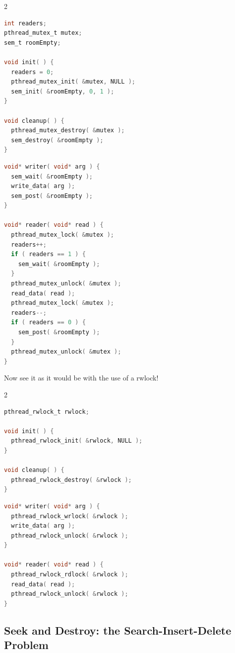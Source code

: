 \begin{multicols}{2}
	\begin{lstlisting}[language=C]
int readers;
pthread_mutex_t mutex;
sem_t roomEmpty;

void init( ) {
  readers = 0;
  pthread_mutex_init( &mutex, NULL );
  sem_init( &roomEmpty, 0, 1 );
}

void cleanup( ) {
  pthread_mutex_destroy( &mutex );
  sem_destroy( &roomEmpty );
}
\end{lstlisting}

	\columnbreak

	\begin{lstlisting}[language=C]
void* writer( void* arg ) {
  sem_wait( &roomEmpty );
  write_data( arg );
  sem_post( &roomEmpty );
}

void* reader( void* read ) {
  pthread_mutex_lock( &mutex );
  readers++;
  if ( readers == 1 ) {
    sem_wait( &roomEmpty );
  }
  pthread_mutex_unlock( &mutex );
  read_data( read );
  pthread_mutex_lock( &mutex );
  readers--;
  if ( readers == 0 ) {
    sem_post( &roomEmpty );
  }
  pthread_mutex_unlock( &mutex );
}
\end{lstlisting}

\end{multicols}

Now see it as it would be with the use of a rwlock!

\begin{multicols}{2}
	\begin{lstlisting}[language=C]
pthread_rwlock_t rwlock;

void init( ) {
  pthread_rwlock_init( &rwlock, NULL );
}

void cleanup( ) {
  pthread_rwlock_destroy( &rwlock );
}
\end{lstlisting}

	\columnbreak

	\begin{lstlisting}[language=C]
void* writer( void* arg ) {
  pthread_rwlock_wrlock( &rwlock );
  write_data( arg );
  pthread_rwlock_unlock( &rwlock );
}

void* reader( void* read ) {
  pthread_rwlock_rdlock( &rwlock );
  read_data( read );
  pthread_rwlock_unlock( &rwlock );
}
\end{lstlisting}

\end{multicols}

\subsection*{Seek and Destroy: the Search-Insert-Delete Problem}

